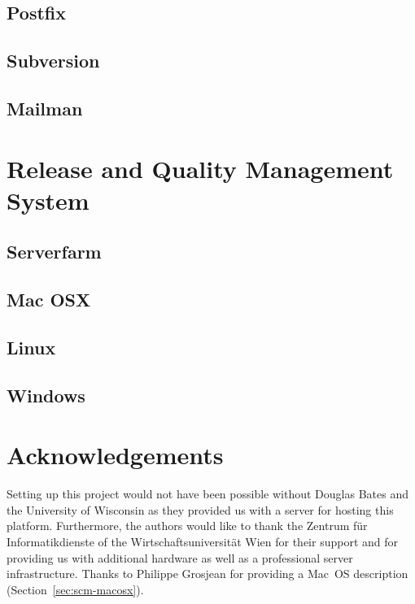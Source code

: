 \documentclass[a4paper]{article}
\begin{document}
\subsection{Postfix}
\subsection{Subversion}
\subsection{Mailman}

\section{Release and Quality Management System}
\label{sec:release_and_QM}

\subsection{Serverfarm}
\subsection{Mac OSX}
\subsection{Linux}
\subsection{Windows}


\section{Acknowledgements}

Setting up this project would not have been possible without Douglas
Bates and the University of Wisconsin as they provided us with a
server for hosting this platform. Furthermore, 
the authors would like to thank the Zentrum f\"ur Informatikdienste  
of the Wirtschaftsuniversit\"at Wien for
their support and for providing us with additional hardware as well as a
professional server infrastructure. 
Thanks to Philippe Grosjean for
providing a Mac~OS description (Section~\ref{sec:scm-macosx}).



\end{document}
